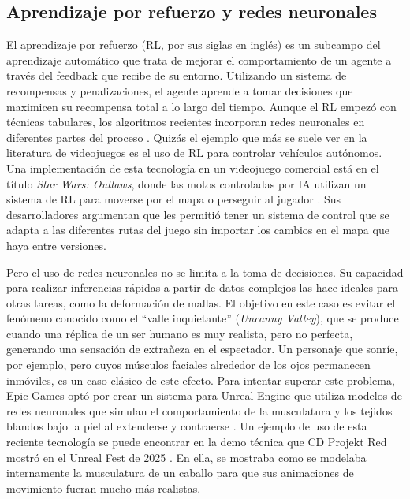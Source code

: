 \subsection{Aprendizaje por refuerzo y redes neuronales}

El aprendizaje por refuerzo (RL, por sus siglas en inglés) es un subcampo del aprendizaje automático que trata de mejorar el comportamiento de un agente a través del feedback que recibe de su entorno. Utilizando un sistema de recompensas y penalizaciones, el agente aprende a tomar decisiones que maximicen su recompensa total a lo largo del tiempo. Aunque el RL empezó con técnicas tabulares, los algoritmos recientes incorporan redes neuronales en diferentes partes del proceso \cite{ghasemi_comprehensive_2025}. Quizás el ejemplo que más se suele ver en la literatura de videojuegos es el uso de RL para controlar vehículos autónomos. Una implementación de esta tecnología en un videojuego comercial está en el título \textit{Star Wars: Outlaws}, donde las motos controladas por IA utilizan un sistema de RL para moverse por el mapa o perseguir al jugador \cite{gaudreau_game_2025}. Sus desarrolladores argumentan que les permitió tener un sistema de control que se adapta a las diferentes rutas del juego sin importar los cambios en el mapa que haya entre versiones.

Pero el uso de redes neuronales no se limita a la toma de decisiones. Su capacidad para realizar inferencias rápidas a partir de datos complejos las hace ideales para otras tareas, como la deformación de mallas. El objetivo en este caso es evitar el fenómeno conocido como el ``valle inquietante'' (\textit{Uncanny Valley}), que se produce cuando una réplica de un ser humano es muy realista, pero no perfecta, generando una sensación de extrañeza en el espectador. Un personaje que sonríe, por ejemplo, pero cuyos músculos faciales alrededor de los ojos permanecen inmóviles, es un caso clásico de este efecto. Para intentar superar este problema, Epic Games optó por crear un sistema para Unreal Engine que utiliza modelos de redes neuronales que simulan el comportamiento de la musculatura y los tejidos blandos bajo la piel al extenderse y contraerse \cite{epic_games_ml_2025}. Un ejemplo de uso de esta reciente tecnología se puede encontrar en la demo técnica que CD Projekt Red mostró en el Unreal Fest de 2025 \cite{cd_projekt_red_witcher_2025}. En ella, se mostraba como se modelaba internamente la musculatura de un caballo para que sus animaciones de movimiento fueran mucho más realistas.

